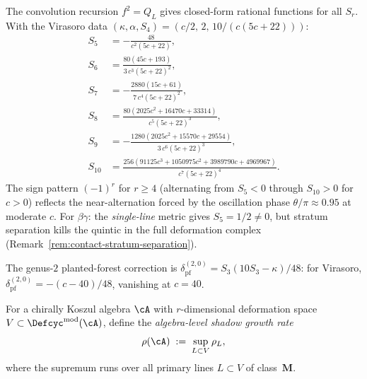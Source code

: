 \begin{remark}
\label{rem:higher-arity-explicit}
The convolution recursion $f^2 = Q_L$ gives
closed-form rational functions for all $S_r$.  With the
Virasoro data $(\kappa, \alpha, S_4) = (c/2,\, 2,\, 10/(c(5c{+}22)))$:
\begin{align}
  S_5 &= -\frac{48}{c^2(5c{+}22)}, \label{eq:virasoro-S5} \\
  S_6 &= \frac{80(45c{+}193)}{3\,c^3(5c{+}22)^2}, \label{eq:virasoro-S6} \\
  S_7 &= -\frac{2880(15c{+}61)}{7\,c^4(5c{+}22)^2}, \label{eq:virasoro-S7} \\
  S_8 &= \frac{80(2025c^2{+}16470c{+}33314)}{c^5(5c{+}22)^3}, \label{eq:virasoro-S8} \\
  S_9 &= -\frac{1280(2025c^2{+}15570c{+}29554)}{3\,c^6(5c{+}22)^3}, \label{eq:virasoro-S9} \\
  S_{10} &= \frac{256(91125c^3{+}1050975c^2{+}3989790c{+}4969967)}{c^7(5c{+}22)^4}. \label{eq:virasoro-S10}
\end{align}
The sign pattern $(-1)^r$ for $r \geq 4$ (alternating from $S_5 < 0$
through $S_{10} > 0$ for $c > 0$)
reflects the near-alternation forced by the oscillation phase
$\theta/\pi \approx 0.95$ at moderate $c$.
For $\beta\gamma$: the \emph{single-line} metric gives
$S_5 = 1/2 \neq 0$, but stratum separation kills the
quintic in the full deformation complex
(Remark~\textup{\ref{rem:contact-stratum-separation}}).

The genus-$2$ planted-forest correction is
$\delta_{\mathrm{pf}}^{(2,0)} = S_3(10 S_3 - \kappa)/48$:
for Virasoro, $\delta_{\mathrm{pf}}^{(2,0)} = -(c{-}40)/48$,
vanishing at $c = 40$.
\end{remark}

\begin{definition}
\label{def:multi-line-shadow-radius}
For a chirally Koszul algebra $\cA$ with
$r$-dimensional deformation space
$V \subset \Defcyc^{\mathrm{mod}}(\cA)$, define the
\emph{algebra-level shadow growth rate}
\begin{equation}\label{eq:algebra-level-rho}
  \rho(\cA)
  \;:=\;
  \sup_{L \subset V}
  \rho_L,
\end{equation}
where the supremum runs over all primary lines
$L \subset V$ of class~$\mathbf{M}$.
\end{definition}


